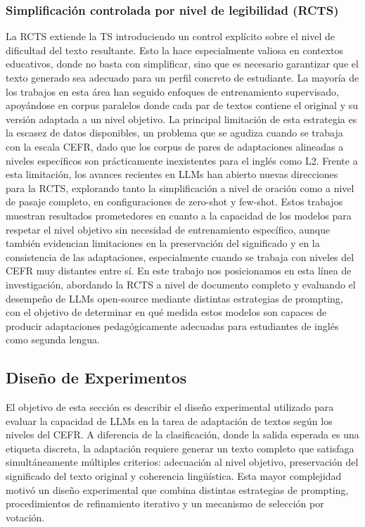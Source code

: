 \subsubsection*{Simplificación controlada por nivel de legibilidad (RCTS)}
La RCTS extiende la TS introduciendo un control explícito sobre el nivel de dificultad del texto resultante. Esto la hace especialmente valiosa en contextos educativos, donde no basta con simplificar, sino que es necesario garantizar que el texto generado sea adecuado para un perfil concreto de estudiante. La mayoría de los trabajos en esta área han seguido enfoques de entrenamiento supervisado, apoyándose en corpus paralelos donde cada par de textos contiene el original y su versión adaptada a un nivel objetivo. La principal limitación de esta estrategia es la escasez de datos disponibles, un problema que se agudiza cuando se trabaja con la escala CEFR, dado que los corpus de pares de adaptaciones alineadas a niveles específicos son prácticamente inexistentes para el inglés como L2.
Frente a esta limitación, los avances recientes en LLMs han abierto nuevas direcciones para la RCTS, explorando tanto la simplificación a nivel de oración como a nivel de pasaje completo, en configuraciones de zero-shot y few-shot. Estos trabajos muestran resultados prometedores en cuanto a la capacidad de los modelos para respetar el nivel objetivo sin necesidad de entrenamiento específico, aunque también evidencian limitaciones en la preservación del significado y en la consistencia de las adaptaciones, especialmente cuando se trabaja con niveles del CEFR muy distantes entre sí.
En este trabajo nos posicionamos en esta línea de investigación, abordando la RCTS a nivel de documento completo y evaluando el desempeño de LLMs open-source mediante distintas estrategias de prompting, con el objetivo de determinar en qué medida estos modelos son capaces de producir adaptaciones pedagógicamente adecuadas para estudiantes de inglés como segunda lengua.

\subsection{Diseño de Experimentos}\label{subsection:ad_diseño}
El objetivo de esta sección es describir el diseño experimental utilizado para evaluar la capacidad de LLMs en la tarea de adaptación de textos según los niveles del CEFR. A diferencia de la clasificación, donde la salida esperada es una etiqueta discreta, la adaptación requiere generar un texto completo que satisfaga simultáneamente múltiples criterios: adecuación al nivel objetivo, preservación del significado del texto original y coherencia lingüística. Esta mayor complejidad motivó un diseño experimental que combina distintas estrategias de prompting, procedimientos de refinamiento iterativo y un mecanismo de selección por votación.

